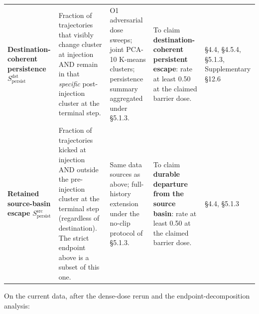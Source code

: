 \documentclass{article}
\theoremstyle{plain}
\theoremstyle{definition}
\begin{document}
\begin{table}[h!]
\begin{tabularx}{\textwidth}{lYYYY}
\textbf{Destination-coherent persistence} \(S_{\mathrm{persist}}^{\mathrm{dst}}\) & Fraction of trajectories that visibly change cluster at injection AND remain in that \textit{specific} post-injection cluster at the terminal step. & O1 adversarial dose sweeps; joint PCA-10 K-means clusters; persistence summary aggregated under §5.1.3. & To claim \textbf{destination-coherent persistent escape}: rate at least 0.50 at the claimed barrier dose. & §4.4, §4.5.4, §5.1.3, Supplementary §12.6 \\
\textbf{Retained source-basin escape} \(S_{\mathrm{persist}}^{\mathrm{src}}\) & Fraction of trajectories kicked at injection AND outside the pre-injection cluster at the terminal step (regardless of destination). The strict endpoint above is a subset of this one. & Same data sources as above; full-history extension under the no-clip protocol of §5.1.3. & To claim \textbf{durable departure from the source basin}: rate at least 0.50 at the claimed barrier dose. & §4.4, §5.1.3 \\
\bottomrule
\end{tabularx}
\end{table}

On the current data, after the dense-dose rerun and the endpoint-decomposition analysis:
\end{document}
